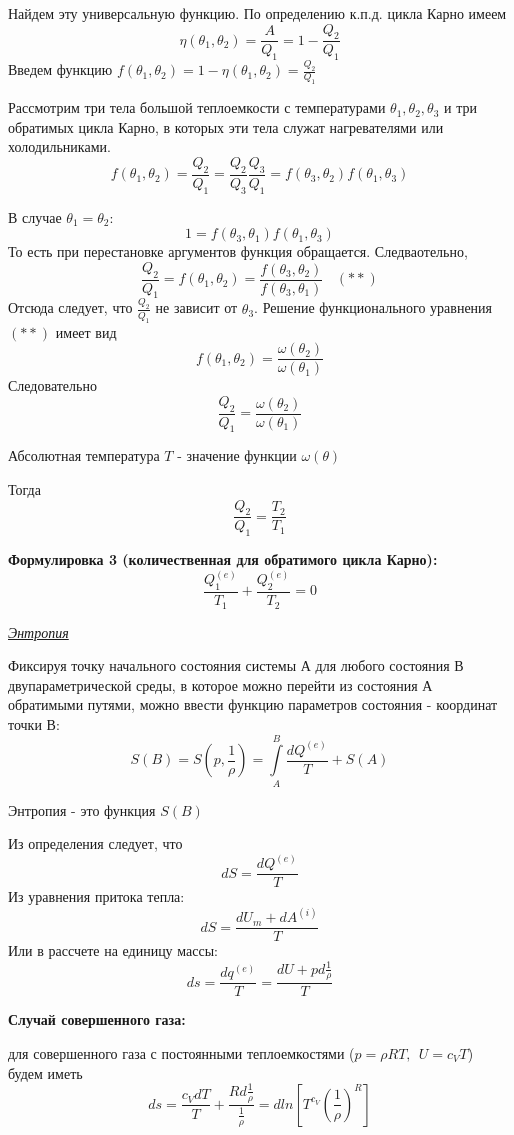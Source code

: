 Найдем эту универсальную функцию.  По определению к.п.д. цикла Карно имеем
$$ \eta(\theta_1, \theta_2) = \frac{A}{Q_1} = 1 - \frac{Q_2}{Q_1} $$
Введем функцию $f(\theta_1, \theta_2) = 1 - \eta(\theta_1, \theta_2) = \frac{Q_2}{Q_1}$

Рассмотрим три тела большой теплоемкости с температурами $\theta_1, \theta_2, \theta_3$ и три обратимых цикла Карно, в которых эти тела служат нагревателями или холодильниками.
$$ f(\theta_1, \theta_2) = \frac{Q_2}{Q_1} = \frac{Q_2}{Q_3}\frac{Q_3}{Q_1} = f(\theta_3, \theta_2)f(\theta_1, \theta_3) $$

В случае $\theta_1 = \theta_2$:
$$ 1 = f(\theta_3, \theta_1)f(\theta_1, \theta_3) $$
То есть при перестановке аргументов функция обращается. Следваотельно, 
$$ \frac{Q_2}{Q_1} = f(\theta_1, \theta_2) = \frac{f(\theta_3, \theta_2)}{f(\theta_3, \theta_1)} \ \ \ \ (**)$$
Отсюда следует, что $\frac{Q_2}{Q_1}$ не зависит от $\theta_3$.  Решение функционального уравнения $(**)$ имеет вид
$$ f(\theta_1, \theta_2) = \frac{\omega(\theta_2)}{\omega(\theta_1)} $$
Следовательно $$ \frac{Q_2}{Q_1} = \frac{\omega(\theta_2)}{\omega(\theta_1)} $$

\begin{defn}
	Абсолютная температура $T$ - значение функции $\omega(\theta)$
\end{defn}

Тогда $$ \frac{Q_2}{Q_1} = \frac{T_2}{T_1} $$

\textbf{Формулировка 3 (количественная для обратимого цикла Карно):} 
$$ \frac{Q_1^{(e)}}{T_1} + \frac{Q_2^{(e)}}{T_2} = 0 $$


\begin{center}
	\textit{\underline{Энтропия}}
\end{center}

Фиксируя точку начального состояния системы А для любого состояния В двупараметрической среды, в которое можно перейти из состояния А обратимыми путями, можно ввести функцию параметров состояния - координат точки В:
$$ S(B) = S\left(p, \frac{1}{\rho}\right) = \int\limits_{A}^{B}\frac{dQ^{(e)}}{T} + S(A) $$

\begin{defn}
	 Энтропия - это функция $S(B)$
\end{defn}

Из определения следует, что $$ dS = \frac{dQ^{(e)}}{T} $$
Из уравнения притока тепла:
$$ dS = \frac{dU_m + dA^{(i)}}{T} $$
Или в рассчете на единицу массы:
$$ ds = \frac{dq^{(e)}}{T} = \frac{dU + pd\frac{1}{\rho}}{T} $$

\textbf{Случай совершенного газа:}

для совершенного газа с постоянными теплоемкостями ($p = \rho R T, \ \ U = c_V T$) будем иметь
$$ ds = \frac{c_VdT}{T} + \frac{Rd\frac{1}{\rho}}{\frac{1}{\rho}} = dln\left[T^{c_V}\left( \frac{1}{\rho} \right)^{R}\right] $$



